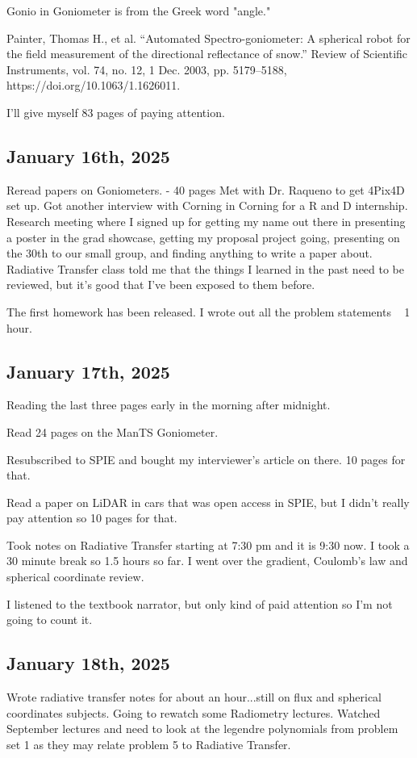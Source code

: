 \documentclass{article}
\begin{document}
Gonio in Goniometer is from the Greek word "angle."

Painter, Thomas H., et al. “Automated Spectro-goniometer: A spherical robot for the field measurement of the directional reflectance of snow.” Review of Scientific Instruments, vol. 74, no. 12, 1 Dec. 2003, pp. 5179–5188, https://doi.org/10.1063/1.1626011. 

I'll give myself 83 pages of paying attention. 

\subsection{January 16th, 2025}
Reread papers on Goniometers. - 40 pages 
Met with Dr. Raqueno to get 4Pix4D set up. 
Got another interview with Corning in Corning for a R and D internship. 
Research meeting where I signed up for getting my name out there in presenting a poster in the grad showcase, getting my proposal project going, presenting on the 30th to our small group, and finding anything to write a paper about. 
Radiative Transfer class told me that the things I learned in the past need to be reviewed, but it's good that I've been exposed to them before. 

The first homework has been released. 
I wrote out all the problem statements ~ 1 hour. 

\subsection{January 17th, 2025}
Reading the last three pages early in the morning after midnight. 

Read 24 pages on the ManTS Goniometer.  

Resubscribed to SPIE and bought my interviewer's article on there. 10 pages for that. 

Read a paper on LiDAR in cars that was open access in SPIE, but I didn't really pay attention so 10 pages for that. 

Took notes on Radiative Transfer starting at 7:30 pm and it is 9:30 now. I took a 30 minute break so 1.5 hours so far. I went over the gradient, Coulomb's law and spherical coordinate review.  

I listened to the textbook narrator, but only kind of paid attention so I'm not going to count it. 


\subsection{January 18th, 2025}
Wrote radiative transfer notes for about an hour...still on flux and spherical coordinates subjects. Going to rewatch some Radiometry lectures. Watched September lectures and need to look at the legendre polynomials from problem set 1 as they may relate problem 5 to Radiative Transfer.
\end{document}
